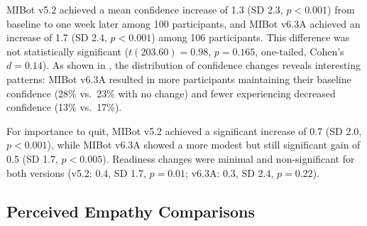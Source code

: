 MIBot v5.2 achieved a mean confidence increase of 1.3 (SD 2.3, $p<0.001$)
from baseline to one week later among 100 participants, and
MIBot v6.3A achieved an increase of 1.7 (SD 2.4, $p<0.001$) among 106 participants.
This difference was not statistically significant ($t(203.60) = 0.98$,
$p = 0.165$, one-tailed, Cohen's $d = 0.14$). As shown in ,
the distribution of confidence changes reveals interesting patterns: MIBot v6.3A
resulted in more participants maintaining their baseline confidence (28\% vs.\ 23\%
with no change) and fewer experiencing decreased confidence (13\% vs.\ 17\%).

For importance to quit, MIBot v5.2 achieved a significant increase of 0.7 (SD 2.0, $p<0.001$), while MIBot v6.3A showed a more modest but still significant gain of 0.5 (SD 1.7, $p<0.005$). Readiness changes were minimal and non-significant for both versions (v5.2: 0.4, SD 1.7, $p=0.01$; v6.3A: 0.3, SD 2.4, $p=0.22$).

\subsection*{Perceived Empathy Comparisons}

